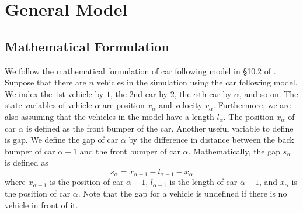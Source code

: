\documentclass[12pt]{article}
\begin{document}
    \section{General Model}
    \subsection{Mathematical Formulation}\label{ch1}
        We follow the mathematical formulation of car following model in \S 10.2 of \cite{traffic}. Suppose that there are $n$ vehicles in the simulation using the car following model. We index the $1$st vehicle by $1$, the $2$nd car by $2$, the $\alpha$th car by $\alpha$, and so on. The state variables of vehicle $\alpha$ are position $x_\alpha$ and velocity $v_\alpha$. Furthermore, we are also assuming that the vehicles in the model have a length $l_{\alpha}$. The position $x_\alpha$ of car $\alpha$ is defined as the front bumper of the car. Another useful variable to define is gap. We define the gap of car $\alpha$ by the difference in distance between the back bumper of car $\alpha - 1$ and the front bumper of car $\alpha$. Mathematically, the gap $s_\alpha$ is defined as 
        \begin{equation} 
          s_\alpha = x_{\alpha - 1} - l_{\alpha -1}  - x_{\alpha}
        \end{equation}
        where $x_{\alpha - 1}$ is the position of car $\alpha - 1$, $l_{\alpha - 1}$ is the length of car $\alpha - 1$, and $x_\alpha$ is the position of car $\alpha$. Note that the gap for a vehicle is undefined if there is no vehicle in front of it. 
\end{document}
